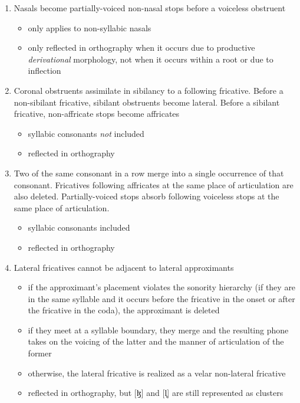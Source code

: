 \documentclass[a4paper,11pt,oneside,openany]{memoir}
\newcommand{\bripa}[1]{[#1]}
\newcommand{\latfrivoic}{ɮ}
\newcommand{\vless}{̥}
\begin{document}
\begin{enumerate}
\begin{itemize}
    \end{itemize}
    \item Nasals become partially-voiced non-nasal stops before a voiceless obstruent
    \begin{itemize}
        \item only applies to non-syllabic nasals
        \item only reflected in orthography when it occurs due to productive \emph{derivational} morphology, not when it occurs within a root or due to inflection
    \end{itemize}
    \item Coronal obstruents assimilate in sibilancy to a following fricative. Before a non-sibilant fricative, sibilant obstruents become lateral. Before a sibilant fricative, non-affricate stops become affricates
    \begin{itemize}
        \item syllabic consonants \emph{not} included
        \item reflected in orthography
    \end{itemize}
    \item Two of the same consonant in a row merge into a single occurrence of that consonant. Fricatives following affricates at the same place of articulation are also deleted. Partially-voiced stops absorb following voiceless stops at the same place of articulation.
    \begin{itemize}
        \item syllabic consonants included
        \item reflected in orthography
    \end{itemize}
    \item Lateral fricatives cannot be adjacent to lateral approximants
    \begin{itemize}
        \item if the approximant's placement violates the sonority hierarchy (if they are in the same syllable and it occurs before the fricative in the onset or after the fricative in the coda), the approximant is deleted
        \item if they meet at a syllable boundary, they merge and the resulting phone takes on the voicing of the latter and the manner of articulation of the former
        \item otherwise, the lateral fricative is realized as a velar non-lateral fricative
        \item reflected in orthography, but \bripa{\latfrivoic} and \bripa{l\vless} are still represented as clusters
    \end{itemize}
\end{enumerate}
\end{document}
